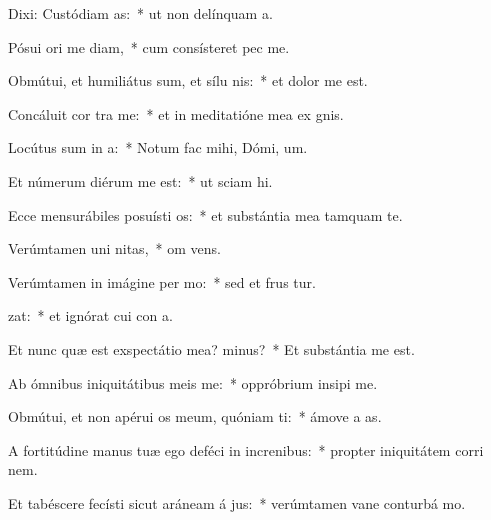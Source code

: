 \item Dixi: Custódiam  as:~* ut non delínquam   a.
\item Pósui ori me diam,~* cum consísteret pec  me.
\item Obmútui, et humiliátus sum, et sílu  nis:~* et dolor me  est.
\item Concáluit cor  tra me:~* et in meditatióne mea ex gnis.
\item Locútus sum in  a:~* Notum fac mihi, Dómi,  um.
\item Et númerum diérum me  est:~* ut sciam   hi.
\item Ecce mensurábiles posuísti  os:~* et substántia mea tamquam   te.
\item Verúmtamen uni nitas,~* om  vens.
\item Verúmtamen in imágine per mo:~* sed et frus tur.
\item {}zat:~* et ignórat cui con a.
\item Et nunc quæ est exspectátio mea?  minus?~* Et substántia me   est.
\item Ab ómnibus iniquitátibus meis  me:~* oppróbrium insipi  me.
\item Obmútui, et non apérui os meum, quóniam  ti:~* ámove a   as.
\item A fortitúdine manus tuæ ego deféci in increnibus:~* propter iniquitátem corri nem.
\item Et tabéscere fecísti sicut aráneam á jus:~* verúmtamen vane conturbá  mo.
